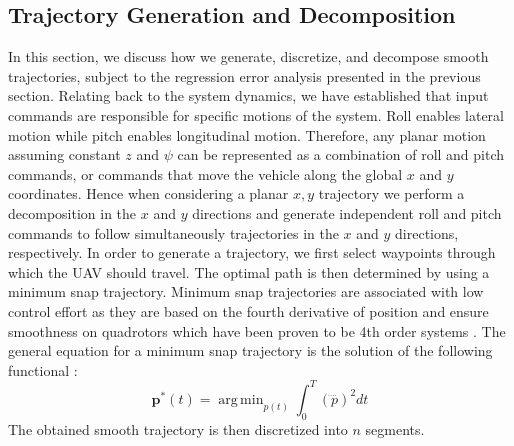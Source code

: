 \documentclass[letterpaper, 10 pt, conference]{ieeeconf}  %
\newcommand\NB[1]{$\spadesuit$\footnote{NB: #1}}
\DeclareMathOperator*{\argmin}{arg\,min}
\begin{document}
\subsection{Trajectory Generation and Decomposition} \label{sec:traj}
In this section, we discuss how we generate, discretize, and decompose smooth trajectories, subject to the regression error analysis presented in the previous section.
Relating back to the system dynamics, we have established that input commands are responsible for specific motions of the system. Roll enables lateral motion while pitch enables longitudinal motion. Therefore, any planar motion assuming constant $z$ and $\psi$ can be represented as a combination of roll and pitch commands, or commands that move the vehicle along the global $x$ and $y$ coordinates. Hence when considering a planar $x,y$ trajectory we perform a decomposition in the $x$ and $y$ directions and generate independent roll and pitch commands to follow simultaneously trajectories in the $x$ and $y$ directions, respectively. 
In order to generate a trajectory, we first select waypoints through which the UAV should travel. The optimal path is then determined by using a minimum snap trajectory. Minimum snap trajectories are associated with low control effort as they are based on the fourth derivative of position and ensure smoothness on quadrotors which have been proven to be 4th order systems \cite{minsnap}. The general equation for a minimum snap trajectory is the solution of the following functional \cite{minsnap}:
\begin{equation} \label{eq:minjerkint}
    \bm{p}^*(t) = \argmin_{p(t)}\int_0^T(\ddddot{p})^2dt
\end{equation}
The obtained smooth trajectory is then discretized into $n$ segments.
\end{document}
